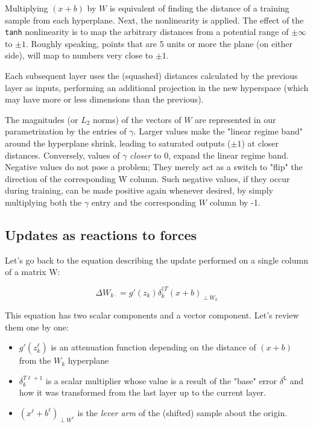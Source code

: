 \documentclass[]{article}
\begin{document}
	 	Multiplying $(x+b)$ by $W$ is equivalent of finding the distance of a training sample from each hyperplane. Next, the nonlinearity is applied. The effect of the \texttt{tanh} nonlinearity is to map the arbitrary distances from a potential range of $\pm \infty$ to $\pm 1$. Roughly speaking, points that are 5 units or more the plane (on either side), will map to numbers very close to $\pm1$.
	 	
	 	Each subsequent layer uses the (squashed) distances calculated by the previous layer as inputs, performing an additional projection in the new hyperspace (which may have more or less dimensions than the previous).
	 	
	 	The magnitudes (or $L_2$ norms)  of the vectors of $W$ are represented in our parametrization by the entries of $\gamma$. Larger values make the "linear regime band" around the hyperplane shrink, leading to saturated outputs ($\pm1$) at closer distances. Conversely, values of $\gamma$ \textit{closer} to 0, expand the linear regime band. Negative values do not pose a problem; They merely act as a switch to "flip" the direction of the corresponding W column. Such negative values, if they occur during training, can be made positive again whenever desired, by simply multiplying both the $\gamma$ entry and the corresponding $W$ column by -1.
	 	
	 \subsection{Updates as reactions to forces}
	 	Let's go back to the equation describing the update performed on a single column of a matrix W:
	 	
			$$\Delta W_{k\cdot}  = g'(z_k)  \delta^{\dagger T}_k (x+b)_{\perp W_k}$$
	 	
	 	This equation has two scalar components and a vector component. Let's review them one by one:
	 	
	  	\begin{itemize}
	  		\item $g'(z^{\ell}_k)$ is an attenuation function depending on the distance of $(x+b)$ from the $W_k$ hyperplane
	  		\item  $\delta^{T\ell+1}_k$ is a scalar multiplier whose value is a result of the "base" error $\delta^\mathtt{L}$ and how it was transformed from the last layer up to the current layer. 
	  		\item $(x^{\ell}+b^{\ell})_{\perp W^\ell}$ is the \textit{lever arm} of the (shifted) sample about the origin.
	  	\end{itemize}
		
\end{document}
